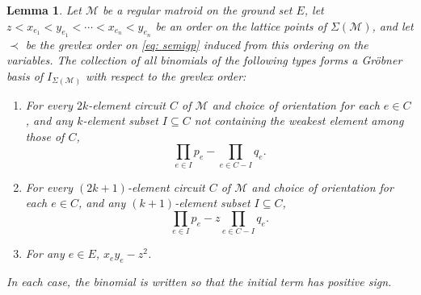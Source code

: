 \documentclass{amsart}
\numberwithin{equation}{section}
\theoremstyle{plain}
\newtheorem{lem}[thm]{Lemma}
\theoremstyle{definition}
\newcommand{\calM}{\mathcal{M}}
\begin{document}
\begin{lem}\label{lem: initial terms}
    Let $\calM$ be a regular matroid on the ground set $E$, let $z < x_{e_1} < y_{e_1} < \cdots < x_{e_n} < y_{e_n}$ be an order on the lattice points of $\Sigma(\calM)$, and let $\prec$ be the grevlex order on \eqref{eq: semigp} induced from this ordering on the variables.
    The collection of all binomials of the following types forms a Gr\"obner basis of $I_{\Sigma(\calM)}$ with respect to the grevlex order:
    \begin{enumerate}[label={\rm (\roman*)}]
        \item For every $2k$-element circuit $C$ of $\calM$ and choice of orientation for each $e \in C$, and any $k$-element subset $I \subseteq C$ not containing the weakest element among those of $C$,
        \[
            \prod_{e \in I} p_e - \prod_{e \in C - I} q_e.
        \]
        \item For every $(2k+1)$-element circuit $C$ of $\calM$ and choice of orientation for each $e \in C$, and any $(k+1)$-element subset $I \subseteq C$,
        \[
            \prod_{e \in I} p_e - z\prod_{e \in C - I} q_e.
        \]
        \item For any $e \in E$, $x_ey_e - z^2$.
    \end{enumerate}
    In each case, the binomial is written so that the initial term has positive sign.
\end{lem}
\end{document}
